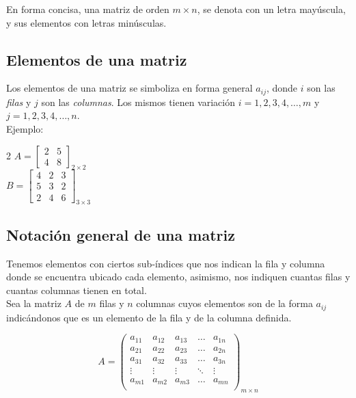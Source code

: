 \documentclass[12pt, a5paper]{article}
\begin{document}
En forma concisa, una matriz de orden $m \times n$, se denota con un letra mayúscula, y sus elementos con letras minúsculas.

\subsection*{Elementos de una matriz}
\noindent Los elementos de una matriz se simboliza en forma general {\Large $a_{ij}$}, donde $i$ son las \textit{filas} y $j$ son las \textit{columnas}. Los mismos tienen variación $i = 1, 2, 3, 4, \ldots , m$ y $j = 1, 2, 3, 4, \ldots, n$. \\

\noindent Ejemplo:

\begin{multicols}{2}
$A = \begin{bmatrix}
 2 & 5 \\
 4 & 8
\end{bmatrix}_{2 \times 2}$ \\ 

$B = \begin{bmatrix}
4 & 2 & 3 \\
5 & 3 & 2 \\
2 & 4 & 6
\end{bmatrix}_{3 \times 3}$
\end{multicols}

\subsection*{Notación general de una matriz}
Tenemos elementos con ciertos sub-índices que nos indican la fila y columna donde se encuentra ubicado cada elemento, asimismo, nos indiquen cuantas filas y cuantas columnas tienen en total. \\

\noindent Sea la matriz $A$ de $m$ filas y $n$ columnas cuyos elementos son de la forma $a_{ij}$ indicándonos que es un elemento de la fila y de la columna definida.

$$
A = \begin{pmatrix}
a_{11} & a_{12} & a_{13} & \dots & a_{1n} \\
a_{21} & a_{22} & a_{23} & \dots & a_{2n} \\
a_{31} & a_{32} & a_{33} & \dots & a_{3n} \\
\vdots & \vdots & \vdots & \ddots & \vdots \\
a_{m1} & a_{m2} & a_{m3} & \dots & a_{mn} \\
\end{pmatrix}_{m \times n}
$$
\end{document}
